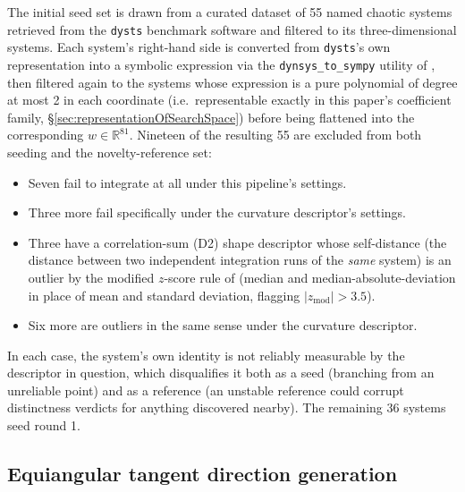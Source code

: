 \documentclass[11pt]{article}
\begin{document}
The initial seed set is drawn from a curated dataset of 55 named chaotic
systems retrieved from the \texttt{dysts} benchmark software
\citep{gilpin2021chaos,gilpin2023model} and filtered to its three-dimensional
systems. Each system's right-hand side is converted from \texttt{dysts}'s own
representation into a symbolic expression via the \texttt{dynsys\_to\_sympy}
utility of \citet{stevenshaas2024genexperiments}, then filtered again to the
systems whose expression is a pure polynomial of degree at most 2 in each
coordinate (i.e.\ representable exactly in this paper's coefficient family,
\S\ref{sec:representationOfSearchSpace}) before being flattened into the corresponding
$w \in \mathbb{R}^{81}$. Nineteen of the resulting 55 are excluded from
both seeding and the novelty-reference set:
\begin{itemize}
  \item Seven fail to integrate at all under this pipeline's settings.
  \item Three more fail specifically under the curvature descriptor's
  settings.
  \item Three have a correlation-sum (D2) shape descriptor whose
  self-distance (the distance between two independent integration runs of
  the \emph{same} system) is an outlier by the modified $z$-score rule of
  \citet{iglewicz1993detect} (median and median-absolute-deviation in place
  of mean and standard deviation, flagging $|z_{\mathrm{mod}}| > 3.5$).
  \item Six more are outliers in the same sense under the curvature
  descriptor.
\end{itemize}
In each case, the system's own identity is not reliably measurable by the 
descriptor in question, which disqualifies it both as a seed (branching from an
unreliable point) and as a reference (an unstable reference could corrupt
distinctness verdicts for anything discovered nearby). The remaining 36
systems seed round 1.

\subsection{Equiangular tangent direction generation}
\end{document}
